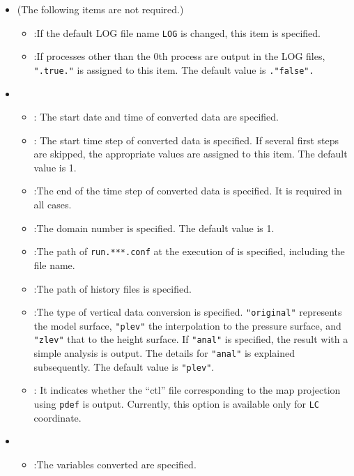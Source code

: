 \begin{itemize}
 \item {} (The following items are not required.)
 \begin{itemize}
  \item {}:If the default LOG file name \verb|LOG| is changed, this item is specified.
  \item {}:If processes other than the 0th process are output in the LOG files,
\verb|".true."| is assigned to this item.  The default value is \verb|."false".|
 \end{itemize}
 \item {}
 \begin{itemize}
  \item {} : The start date and time of converted \netcdf data are specified.
  \item {} : The start time step of converted \netcdf data is specified.
    If several first steps are skipped, the appropriate values are assigned to this item.
    The default value is 1.
  \item {}:The end of the time step of converted \netcdf data is specified.
    It is required in all cases.
  \item {}:The domain number is specified. The default value is 1.
  \item {}:The path of \verb|run.***.conf| at the execution of \scalerm is specified, including the file name.
  \item {}:The path of history files is specified.
  \item {}:The type of vertical data conversion is specified. \verb|"original"| represents the model surface,
    \verb|"plev"| the interpolation to the pressure surface,
    and \verb|"zlev"| that to the height surface.
    If \verb|"anal"| is specified, the result with a simple analysis is output. The details for \verb|"anal"| is explained subsequently.
    The default value is \verb|"plev"|.
  \item {}: It indicates whether the ``ctl'' file corresponding to the map projection using \verb|pdef| is output. Currently, this option is available only for \verb|LC| coordinate.
 \end{itemize}
 \item {}
 \begin{itemize}
  \item {}:The variables converted are specified.

\end{itemize}
\end{itemize}

